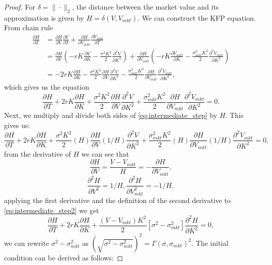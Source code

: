 \documentclass{article}
\theoremstyle{plain}%
\theoremstyle{definition}
\theoremstyle{remark}
\begin{document}
\begin{proof}
For $\delta = \|\cdot\|_2$, the distance between the market value and its approximation is given by $H=\delta(V, V_{mkt})$. We can construct the KFP equation. From chain rule
\begin{align*}
\frac{\partial H}{\partial T} &= \frac{\partial H}{\partial V}\frac{\partial V}{\partial T} + \frac{\partial H}{\partial V_{mkt}}\frac{\partial V_{mkt}}{\partial T}\\
&= \frac{\partial H}{\partial V}(-rK\frac{\partial V}{\partial K} - \frac{\sigma^2 K^2}{2}\frac{\partial^2 V}{\partial K^2}) +\frac{\partial H}{\partial V_{mkt}}(-rK\frac{\partial V_{mkt}}{\partial K} - \frac{\sigma_{mkt}^2 K^2}{2}\frac{\partial^2 V_{mkt}}{\partial K^2})\\
& = -2rK\frac{\partial H}{\partial K} - \frac{\sigma^2 K^2}{2}\frac{\partial H}{\partial V}\frac{\partial^2 V}{\partial K^2} - \frac{\sigma_{mkt}^2 K^2}{2}\frac{\partial H}{\partial V_{mkt}}\frac{\partial^2 V_{mkt}}{\partial K^2},
\end{align*}
which gives us the equation
\begin{equation}
    \frac{\partial H}{\partial T} + 2rK\frac{\partial H}{\partial K} + \frac{\sigma^2 K^2}{2}\frac{\partial H}{\partial V}\frac{\partial^2 V}{\partial K^2} + \frac{\sigma_{mkt}^2 K^2}{2}\frac{\partial H}{\partial V_{mkt}}\frac{\partial^2 V_{mkt}}{\partial K^2} = 0.
    \label{eq:intermediate_step}
\end{equation}
Next, we multiply and divide both sides of \eqref{eq:intermediate_step} by $H$. This gives us:
\begin{equation}
    \frac{\partial H}{\partial T} + 2rK\frac{\partial H}{\partial K} + \frac{\sigma^2 K^2}{2}(H)\frac{\partial H}{\partial V}(1/H)\frac{\partial^2 V}{\partial K^2} + \frac{\sigma_{mkt}^2 K^2}{2}(H)\frac{\partial H}{\partial V_{mkt}}(1/H)\frac{\partial^2 V_{mkt}}{\partial K^2} = 0,
    \label{eq:intermediate_step2}
\end{equation}
from the derivative of $H$ we can see that
\[
    \frac{\partial H}{\partial V} = \frac{V - V_{mkt}}{H} = -\frac{\partial H}{\partial V_{mkt}},
\]
\[
    \frac{\partial^2 H}{\partial V^2} = 1/H, \frac{\partial^2 H}{\partial V_{mkt}^2} = -1/H,
\]
applying the first derivative and the definition of the second derivative to \eqref{eq:intermediate_step2} we get
\[
    \frac{\partial H}{\partial T} + 2rK\frac{\partial H}{\partial K} + \frac{(V-V_{mkt}) K^2}{2}[\sigma^2 - \sigma_{mkt}^2]\frac{\partial^2 H}{\partial K^2} = 0,
\]
we can rewrite $\sigma^2 - \sigma_{mkt}^2$ as $\left(\sqrt{\sigma^2-\sigma_{mkt}^2}\right)^2 = \Gamma(\sigma,\sigma_{mkt})^2$. The initial condition can be derived as follows:

\end{proof}
\end{document}
